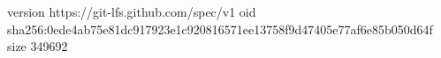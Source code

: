 version https://git-lfs.github.com/spec/v1
oid sha256:0ede4ab75e81dc917923e1c920816571ee13758f9d47405e77af6e85b050d64f
size 349692
